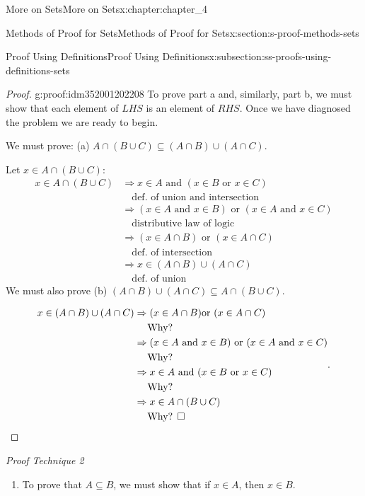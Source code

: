 \documentclass[oneside,10pt,]{book}
\newcommand{\qedhere}{\relax}
\begin{document}
\begin{chapterptx}{More on Sets}{}{More on Sets}{}{}{x:chapter:chapter_4}
\begin{sectionptx}{Methods of Proof for Sets}{}{Methods of Proof for Sets}{}{}{x:section:s-proof-methods-sets}
\begin{subsectionptx}{Proof Using Definitions}{}{Proof Using Definitions}{}{}{x:subsection:ss-proofs-using-definitions-sets}
\begin{proof}{}{g:proof:idm352001202208}
To prove part a and, similarly, part b, we must show that each element of \(LHS\) is an element of \(RHS\).  Once we have diagnosed the problem we are ready to begin.%
\par
We must prove: (a) \(A \cap  (B \cup  C)\subseteq (A\cap B) \cup  (A\cap C)\).%
\par
Let \(x \in  A\cap (B \cup  C)\):%
\begin{equation*}
\begin{split}
x \in A \cap (B \cup C) & \Rightarrow x\in A \textrm{ and } (x\in B\textrm{ or } x\in C)\\
& \quad \textrm{def. of union and intersection}\\
& \Rightarrow  (x \in A\textrm{ and }x\in B)\textrm{ or } (x\in A\textrm{ and }x\in C)\\
&\quad \textrm{distributive law of logic}\\
& \Rightarrow  (x \in A \cap B) \textrm{ or } (x \in A \cap C)\\
&\quad \textrm{def. of intersection}\\
& \Rightarrow  x \in (A \cap B) \cup (A \cap C)\\
&\quad \textrm{def. of union}
\end{split}
\end{equation*}
We must also prove (b) \((A\cap B) \cup  (A\cap C)\subseteq A \cap  (B \cup  C)\).%
\par
%
\begin{equation*}
\begin{split}
x\in (A\cap B) \cup  (A \cap C)& \Rightarrow  (x\in A\cap B)\text{or } (x\in A\cap C)\\
&\quad \textrm{ Why? } \\
& \Rightarrow (x\in A\textrm{ and }x\in B)\textrm{ or } (x\in A\textrm{ and }x\in C)\\
&\quad\textrm{ Why? }\\
&\Rightarrow  x\in A \textrm{ and } (x\in B\textrm{ or }x\in C)\\
&\quad\textrm{ Why? }\\
&\Rightarrow x\in A\cap (B\cup C)\\
&\quad\textrm{ Why? } \square
\end{split}\text{.}\qedhere
\end{equation*}
%
\end{proof}
\emph{Proof Technique 2}%
\par
%
\begin{enumerate}[label=(\arabic*)]
\item{}To prove that \(A\subseteq B\), we must show that if \(x \in  A\), then \(x \in  B\).%

\end{enumerate}
\end{subsectionptx}
\end{sectionptx}
\end{chapterptx}
\end{document}
